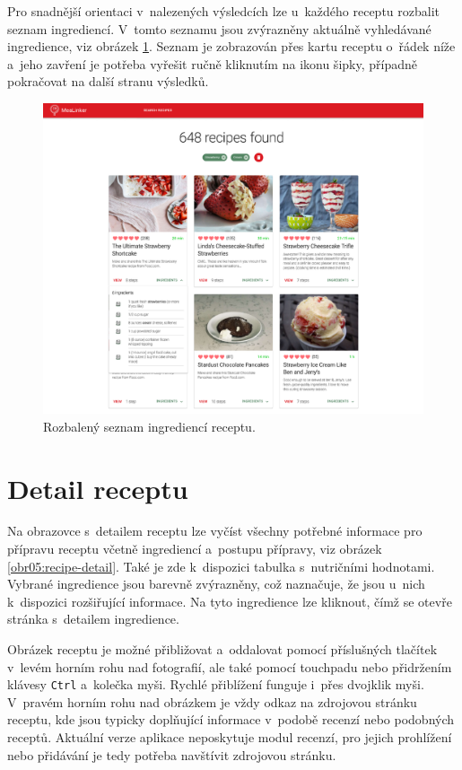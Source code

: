 Pro snadnější orientaci v~nalezených výsledcích lze u~každého receptu rozbalit seznam ingrediencí. V~tomto seznamu jsou zvýrazněny aktuálně vyhledávané ingredience, viz obrázek \ref{obr05:expanded-ingrs}. Seznam je zobrazován přes kartu receptu o~řádek níže a~jeho zavření je potřeba vyřešit ručně kliknutím na ikonu šipky, případně pokračovat na další stranu výsledků.

\begin{figure}[h!]\centering
\includegraphics[width=140mm]{../img/expanded-ingrs}
\caption{Rozbalený seznam ingrediencí receptu.}
\label{obr05:expanded-ingrs}
\end{figure}

\section{Detail receptu}

Na obrazovce s~detailem receptu lze vyčíst všechny potřebné informace pro přípravu receptu včetně ingrediencí a~postupu přípravy, viz obrázek \ref{obr05:recipe-detail}. Také je zde k~dispozici tabulka s~nutričními hodnotami. Vybrané ingredience jsou barevně zvýrazněny, což naznačuje, že jsou u~nich k~dispozici rozšiřující informace. Na tyto ingredience lze kliknout, čímž se otevře stránka s~detailem ingredience.

Obrázek receptu je možné přibližovat a~oddalovat pomocí příslušných tlačítek v~levém horním rohu nad fotografií, ale také pomocí touchpadu nebo přidržením klávesy \texttt{Ctrl} a~kolečka myši. Rychlé přiblížení funguje i~přes dvojklik myši. V~pravém horním rohu nad obrázkem je vždy odkaz na zdrojovou stránku receptu, kde jsou typicky doplňující informace v~podobě recenzí nebo podobných receptů. Aktuální verze aplikace neposkytuje modul recenzí, pro jejich prohlížení nebo přidávání je tedy potřeba navštívit zdrojovou stránku.

